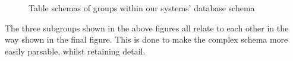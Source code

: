 \documentclass[10pt]{article}
\begin{document}
\begin{figure}[H]
    \centering
    \qquad
    \newline
    \caption{Table schemas of groups within our systems' database schema}
    \label{fig:db_entity_relationship}
\end{figure}




The three subgroups shown in the above figures all relate to each other in the
way shown in the final figure. This is done to make the complex schema more
easily parsable, whilst retaining detail.
\end{document}
